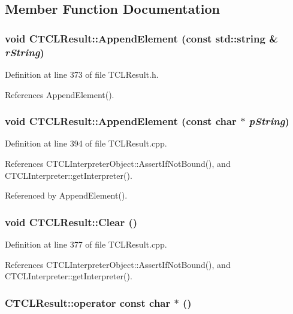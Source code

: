 \subsection{Member Function Documentation}
\subsubsection{\setlength{\rightskip}{0pt plus 5cm}void CTCLResult::Append\-Element (const std::string \& {\em r\-String})\hspace{0.3cm}{\tt  [inline]}}\label{classCTCLResult_a14}




Definition at line 373 of file TCLResult.h.

References Append\-Element().
\subsubsection{\setlength{\rightskip}{0pt plus 5cm}void CTCLResult::Append\-Element (const char $\ast$ {\em p\-String})}\label{classCTCLResult_a13}




Definition at line 394 of file TCLResult.cpp.

References CTCLInterpreter\-Object::Assert\-If\-Not\-Bound(), and CTCLInterpreter::get\-Interpreter().

Referenced by Append\-Element().
\subsubsection{\setlength{\rightskip}{0pt plus 5cm}void CTCLResult::Clear ()}\label{classCTCLResult_a12}




Definition at line 377 of file TCLResult.cpp.

References CTCLInterpreter\-Object::Assert\-If\-Not\-Bound(), and CTCLInterpreter::get\-Interpreter().
\subsubsection{\setlength{\rightskip}{0pt plus 5cm}CTCLResult::operator const char $\ast$ ()}\label{classCTCLResult_a15}




